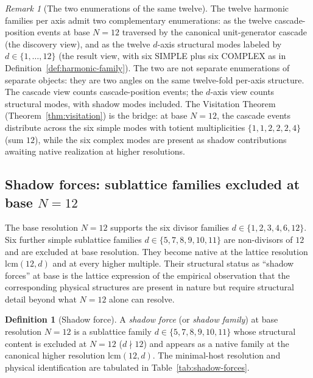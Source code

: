 \documentclass[11pt,a4paper]{article}
\theoremstyle{definition}
\newtheorem{definition}[theorem]{Definition}
\theoremstyle{remark}
\newtheorem{remark}[theorem]{Remark}
\begin{document}
\begin{remark}[The two enumerations of the same twelve]\label{rem:two-enumerations}
The twelve harmonic families per axis admit two complementary enumerations: as the twelve cascade-position events at base $N=12$ traversed by the canonical unit-generator cascade (the discovery view), and as the twelve $d$-axis structural modes labeled by $d \in \{1,\ldots,12\}$ (the result view, with six SIMPLE plus six COMPLEX as in Definition~\ref{def:harmonic-family}). The two are not separate enumerations of separate objects: they are two angles on the same twelve-fold per-axis structure. The cascade view counts cascade-position events; the $d$-axis view counts structural modes, with shadow modes included. The Visitation Theorem (Theorem~\ref{thm:visitation}) is the bridge: at base $N=12$, the cascade events distribute across the six simple modes with totient multiplicities $\{1,1,2,2,2,4\}$ (sum $12$), while the six complex modes are present as shadow contributions awaiting native realization at higher resolutions.
\end{remark}

\subsection{Shadow forces: sublattice families excluded at base $N=12$}\label{subsec:shadow-forces}

The base resolution $N=12$ supports the six divisor families $d\in\{1,2,3,4,6,12\}$. Six further simple sublattice families $d\in\{5,7,8,9,10,11\}$ are non-divisors of $12$ and are excluded at base resolution. They become native at the lattice resolution $\mathrm{lcm}(12,d)$ and at every higher multiple. Their structural status as ``shadow forces'' at base is the lattice expression of the empirical observation that the corresponding physical structures are present in nature but require structural detail beyond what $N=12$ alone can resolve.

\begin{definition}[Shadow force]\label{def:shadow-force}
A \emph{shadow force} (or \emph{shadow family}) at base resolution $N=12$ is a sublattice family $d \in \{5,7,8,9,10,11\}$ whose structural content is excluded at $N=12$ ($d \nmid 12$) and appears as a native family at the canonical higher resolution $\mathrm{lcm}(12,d)$. The minimal-host resolution and physical identification are tabulated in Table~\ref{tab:shadow-forces}.
\end{definition}
\end{document}

